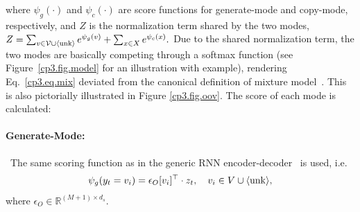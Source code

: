 where $\psi_g(\cdot)$ and $\psi_c(\cdot)$ are score functions for generate-mode and copy-mode, 
respectively, and $Z$ is the normalization term shared by the two modes, 
$Z = \sum_{v\in \cal V \cup {\langle \mathrm{unk}\rangle} }e^{\psi_g(v)} + \sum_{x\in X}e^{\psi_c(x)}.$
Due to the shared normalization term, 
the two modes are basically competing through a softmax function 
(see Figure~\ref{cp3.fig.model} for an illustration with example), 
rendering Eq.~\eqref{cp3.eq.mix} deviated from the canonical definition of mixture model~\cite{GaussianMixture}. This is also pictorially illustrated in Figure \ref{cp3.fig.oov}. 
 The score of each mode is calculated:
\paragraph{Generate-Mode:}~The same scoring function as in the generic RNN encoder-decoder~\cite{bahdanau2014neural} is used, i.e.
\begin{equation}\label{cp3.eq.gen}
	\psi_g(y_t=v_i) = \epsilon_O[v_i]^\top \cdot z_t, \quad v_i \in V \cup {\langle \mathrm{unk}\rangle}, 
\end{equation}
where $\epsilon_O \in \mathbb{R}^{(M+1) \times d_s}$. 

